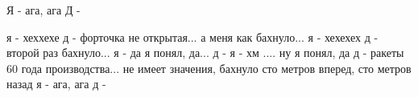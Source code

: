 
 
 
 
 

Я - ага, ага
Д - 

я - хеххехе
д - форточка не открытая... а меня как бахнуло... 
я - хехехех
д - второй раз бахнуло... 
я - да я понял, да...
д - 
я - хм .... ну я понял, да
д - ракеты 60 года производства... не имеет значения, бахнуло сто метров вперед, сто метров назад
я - ага, ага
д -
